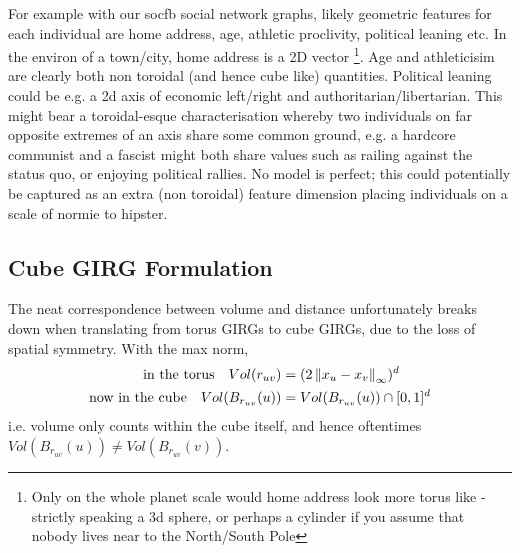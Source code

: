 
For example with our socfb social network graphs, likely geometric features for each individual are home address, age, athletic proclivity, political leaning etc.
In the environ of a town/city, home address is a 2D vector
\footnote{Only on the whole planet scale would home address look more torus like - strictly speaking a 3d sphere, or perhaps a cylinder if you assume that nobody lives near to the North/South Pole}.
Age and athleticisim are clearly both non toroidal (and hence cube like) quantities.
Political leaning could be e.g. a 2d axis of economic left/right and authoritarian/libertarian. This might bear a toroidal-esque characterisation whereby two individuals on far opposite extremes of an axis share some common ground, e.g. a hardcore communist and a fascist might both share values such as railing against the status quo, or enjoying political rallies.
No model is perfect; this could potentially be captured as an extra (non toroidal) feature dimension placing individuals on a scale of normie to hipster.

\subsection{Cube GIRG Formulation}
The neat correspondence between volume and distance unfortunately breaks down when translating from torus GIRGs to cube GIRGs, due to the loss of spatial symmetry.
With the max norm,
\begin{align}
    \text{in the torus} \quad Vol(r_{uv}) &= (2 \left\lVert x_u - x_v\right\rVert_\infty)^d
\\
\text{now in the cube} \quad  Vol(B_{r_{uv}}(u)) &= Vol(B_{r_{uv}}(u)) \cap [0, 1]^d
\end{align}
i.e. volume only counts within the cube itself, and hence oftentimes $Vol(B_{r_{uv}}(u)) \neq Vol(B_{r_{uv}}(v))$. 

